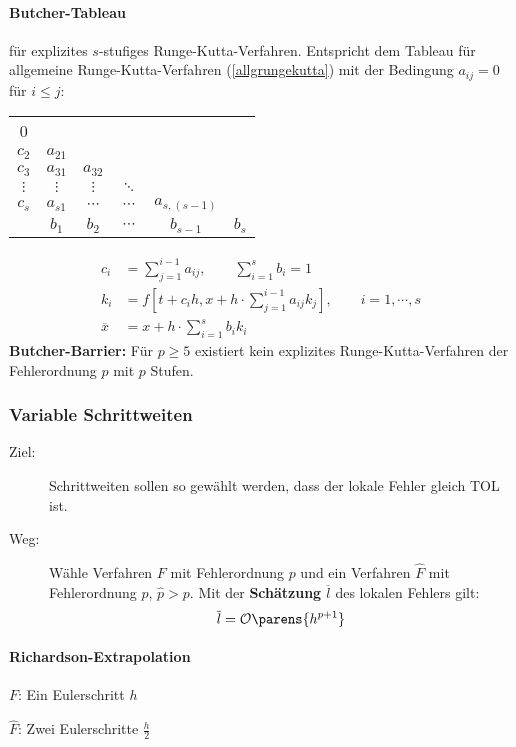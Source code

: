 			\paragraph{Butcher-Tableau}
				für explizites $s$-stufiges Runge-Kutta-Verfahren. Entspricht dem Tableau für allgemeine Runge-Kutta-Verfahren (\ref{allgrungekutta}) mit der Bedingung $a_{ij}=0$ für $i \leq j$: 
				
				\hspace{5ex}
				\begin{tabular}{c|ccccc}
					0 & & & & & \\
					$c_2$ & $a_{21}$ & & & & \\
					$c_3$ & $a_{31}$ & $a_{32}$ & & & \\
					$\vdots$ & $\vdots$ & $\vdots$ & $\ddots$ & & \\
					$c_s$ & $a_{s1}$ & $\cdots$ & $\cdots$ & $a_{s,(s-1)}$ & \\
					\hline & $b_1$ & $b_2$ & $\cdots$ & $b_{s-1}$ & $b_s$\\
				\end{tabular}
				\begin{align*}
					c_i &= \sum\limits_{j=1}^{i-1}a_{ij}, \qquad \sum\limits_{i=1}^s b_i = 1 \\
					k_i &= f\left[t+c_ih , x+h\cdot \sum_{j=1}^{i-1} a_{ij}k_j\right], \qquad i=1, \cdots , s \\
					\overline{x} &= x + h \cdot \sum\limits_{i=1}^s b_ik_i
				\end{align*}
				\textbf{Butcher-Barrier:} Für $p \geq 5$ existiert kein explizites Runge-Kutta-Verfahren der Fehlerordnung $p$ mit $p$ Stufen. 
				
		\subsubsection{Variable Schrittweiten}
			\begin{description}
				\item[Ziel:] Schrittweiten sollen so gewählt werden, dass der lokale Fehler gleich TOL ist.\\
				\item[Weg:] Wähle Verfahren $F$ mit Fehlerordnung $p$ und ein Verfahren $\hat F$ mit Fehlerordnung $\hat p$, $\hat p > p$. Mit der \textbf{Schätzung} $\overline{l}$ des lokalen Fehlers gilt:
					\[
						\overline{l}=\mathcal{O}\parens{ h^{p+1} }
					\]
			\end{description}
			
			\paragraph{Richardson-Extrapolation} 
				\begin{tightitemize}
					\item[$F$:] Ein Eulerschritt $h$
					\item[$\hat F$:] Zwei Eulerschritte $\frac{h}{2}$
				\end{tightitemize}
				
